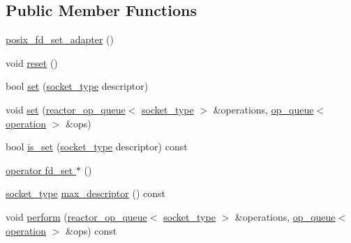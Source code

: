 \subsection*{Public Member Functions}
\begin{DoxyCompactItemize}
\item 
\hyperlink{classasio_1_1detail_1_1posix__fd__set__adapter_ad80448f1d61cb89f505a49b2e2df4bde}{posix\+\_\+fd\+\_\+set\+\_\+adapter} ()
\item 
void \hyperlink{classasio_1_1detail_1_1posix__fd__set__adapter_a31d4feb919f81c8fcfa237fab2c48b60}{reset} ()
\item 
bool \hyperlink{classasio_1_1detail_1_1posix__fd__set__adapter_a80759fe0eb25ffd942a5b167a4f4bf0d}{set} (\hyperlink{namespaceasio_1_1detail_a6798c771dd84b79798b1a08150706ea9}{socket\+\_\+type} descriptor)
\item 
void \hyperlink{classasio_1_1detail_1_1posix__fd__set__adapter_aa20c58d4b3596d0f90d745fec11d9213}{set} (\hyperlink{classasio_1_1detail_1_1reactor__op__queue}{reactor\+\_\+op\+\_\+queue}$<$ \hyperlink{namespaceasio_1_1detail_a6798c771dd84b79798b1a08150706ea9}{socket\+\_\+type} $>$ \&operations, \hyperlink{classasio_1_1detail_1_1op__queue}{op\+\_\+queue}$<$ \hyperlink{namespaceasio_1_1detail_a338968609bec20e37145309f8f9ec936}{operation} $>$ \&ops)
\item 
bool \hyperlink{classasio_1_1detail_1_1posix__fd__set__adapter_aa7cfbf9d551c62ede7069eb7c6b39df2}{is\+\_\+set} (\hyperlink{namespaceasio_1_1detail_a6798c771dd84b79798b1a08150706ea9}{socket\+\_\+type} descriptor) const 
\item 
\hyperlink{classasio_1_1detail_1_1posix__fd__set__adapter_a9569afbfdeb2126ffd8496f472773cb8}{operator fd\+\_\+set $\ast$} ()
\item 
\hyperlink{namespaceasio_1_1detail_a6798c771dd84b79798b1a08150706ea9}{socket\+\_\+type} \hyperlink{classasio_1_1detail_1_1posix__fd__set__adapter_ae61b9519a82e8118a883fb19379a8013}{max\+\_\+descriptor} () const 
\item 
void \hyperlink{classasio_1_1detail_1_1posix__fd__set__adapter_aa93cadcb9c530f14682a339cba902a8a}{perform} (\hyperlink{classasio_1_1detail_1_1reactor__op__queue}{reactor\+\_\+op\+\_\+queue}$<$ \hyperlink{namespaceasio_1_1detail_a6798c771dd84b79798b1a08150706ea9}{socket\+\_\+type} $>$ \&operations, \hyperlink{classasio_1_1detail_1_1op__queue}{op\+\_\+queue}$<$ \hyperlink{namespaceasio_1_1detail_a338968609bec20e37145309f8f9ec936}{operation} $>$ \&ops) const 
\end{DoxyCompactItemize}


